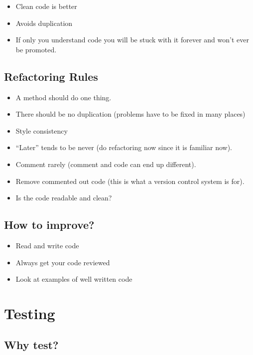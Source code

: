 \begin{itemize}
	\item Clean code is better
	\item Avoids duplication
	\item If only you understand code you will be stuck with it forever and won't ever be promoted.
\end{itemize}

\subsection{Refactoring Rules}\label{sub:refactoring_rules}

\begin{itemize}
	\item A method should do one thing.
	\item There should be no duplication (problems have to be fixed in many places)
	\item Style consistency
	\item ``Later'' tends to be never (do refactoring now since it is familiar now).
	\item Comment rarely (comment and code can end up different).
	\item Remove commented out code (this is what a version control system is for).
	\item Is the code readable and clean?
\end{itemize}

\subsection{How to improve?}\label{sub:how_to_improve_}

\begin{itemize}
	\item Read and write code
	\item Always get your code reviewed
	\item Look at examples of well written code
\end{itemize}

\section{Testing}\label{sec:testing}

\subsection{Why test?}\label{sub:why_test_}

